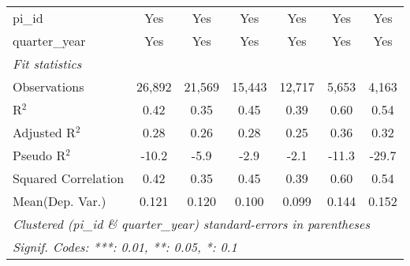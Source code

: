 \begin{tabular}{lcccccc}
   pi\_id                                                     & Yes           & Yes           & Yes          & Yes            & Yes            & Yes\\  
   quarter\_year                                              & Yes           & Yes           & Yes          & Yes            & Yes            & Yes\\  
   \midrule
   \emph{Fit statistics}\\
   Observations                                               & 26,892        & 21,569        & 15,443       & 12,717         & 5,653          & 4,163\\  
   R$^2$                                                      & 0.42          & 0.35          & 0.45         & 0.39           & 0.60           & 0.54\\  
   Adjusted R$^2$                                             & 0.28          & 0.26          & 0.28         & 0.25           & 0.36           & 0.32\\  
   Pseudo R$^2$                                               & -10.2         & -5.9          & -2.9         & -2.1           & -11.3          & -29.7\\  
   Squared Correlation                                        & 0.42          & 0.35          & 0.45         & 0.39           & 0.60           & 0.54\\  
Mean(Dep. Var.) & 0.121 & 0.120 & 0.100 & 0.099 & 0.144 & 0.152 \\
   \midrule \midrule
   \multicolumn{7}{l}{\emph{Clustered (pi\_id \& quarter\_year) standard-errors in parentheses}}\\
   \multicolumn{7}{l}{\emph{Signif. Codes: ***: 0.01, **: 0.05, *: 0.1}}\\
\end{tabular}
\par\endgroup
